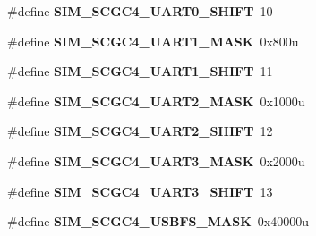 \begin{DoxyCompactItemize}
\item 
\hypertarget{group___s_i_m___register___masks_gae3407d4e1676ac6654898712335842b0}{}\#define {\bfseries S\+I\+M\+\_\+\+S\+C\+G\+C4\+\_\+\+U\+A\+R\+T0\+\_\+\+S\+H\+I\+F\+T}~10\label{group___s_i_m___register___masks_gae3407d4e1676ac6654898712335842b0}

\item 
\hypertarget{group___s_i_m___register___masks_ga24a3ebc9f4c6154041b1a39b33f3c121}{}\#define {\bfseries S\+I\+M\+\_\+\+S\+C\+G\+C4\+\_\+\+U\+A\+R\+T1\+\_\+\+M\+A\+S\+K}~0x800u\label{group___s_i_m___register___masks_ga24a3ebc9f4c6154041b1a39b33f3c121}

\item 
\hypertarget{group___s_i_m___register___masks_ga2eda3e80bcf9a5ee77ce321d86cd92d0}{}\#define {\bfseries S\+I\+M\+\_\+\+S\+C\+G\+C4\+\_\+\+U\+A\+R\+T1\+\_\+\+S\+H\+I\+F\+T}~11\label{group___s_i_m___register___masks_ga2eda3e80bcf9a5ee77ce321d86cd92d0}

\item 
\hypertarget{group___s_i_m___register___masks_gaea7b7b8d6abc055026d4ca7299206597}{}\#define {\bfseries S\+I\+M\+\_\+\+S\+C\+G\+C4\+\_\+\+U\+A\+R\+T2\+\_\+\+M\+A\+S\+K}~0x1000u\label{group___s_i_m___register___masks_gaea7b7b8d6abc055026d4ca7299206597}

\item 
\hypertarget{group___s_i_m___register___masks_gae844b2ce3371466add7387b9ea32bc4c}{}\#define {\bfseries S\+I\+M\+\_\+\+S\+C\+G\+C4\+\_\+\+U\+A\+R\+T2\+\_\+\+S\+H\+I\+F\+T}~12\label{group___s_i_m___register___masks_gae844b2ce3371466add7387b9ea32bc4c}

\item 
\hypertarget{group___s_i_m___register___masks_gaaf5646fd261bf76417a69902f7405a98}{}\#define {\bfseries S\+I\+M\+\_\+\+S\+C\+G\+C4\+\_\+\+U\+A\+R\+T3\+\_\+\+M\+A\+S\+K}~0x2000u\label{group___s_i_m___register___masks_gaaf5646fd261bf76417a69902f7405a98}

\item 
\hypertarget{group___s_i_m___register___masks_ga065aa606af68b4a53adc773e6661b67d}{}\#define {\bfseries S\+I\+M\+\_\+\+S\+C\+G\+C4\+\_\+\+U\+A\+R\+T3\+\_\+\+S\+H\+I\+F\+T}~13\label{group___s_i_m___register___masks_ga065aa606af68b4a53adc773e6661b67d}

\item 
\hypertarget{group___s_i_m___register___masks_ga0a3d8bb24dfab6d8349c5b8ed7fd539f}{}\#define {\bfseries S\+I\+M\+\_\+\+S\+C\+G\+C4\+\_\+\+U\+S\+B\+F\+S\+\_\+\+M\+A\+S\+K}~0x40000u\label{group___s_i_m___register___masks_ga0a3d8bb24dfab6d8349c5b8ed7fd539f}


\end{DoxyCompactItemize}
